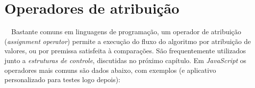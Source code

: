 \documentclass[
  portuguese,
  letterpaper,
  DIV=11,
  numbers=noendperiod]{scrreprt}
\begin{document}
\hfill\break

\section{Operadores de atribuição}\label{operadores-de-atribuiuxe7uxe3o}

~~Bastante comuns em linguagens de programação, um operador de
atribuição (\emph{assignment operator}) permite a execução do fluxo do
algoritmo por atribuição de valores, ou por premissa satisfeita à
comparações. São frequentemente utilizados junto a \emph{estruturas de
controle}, discutidas no próximo capítulo. Em \emph{JavaScript} os
operadores mais comuns são dados abaixo, com exemplos (e aplicativo
personalizado para testes logo depois):

\hfill\break
\end{document}
